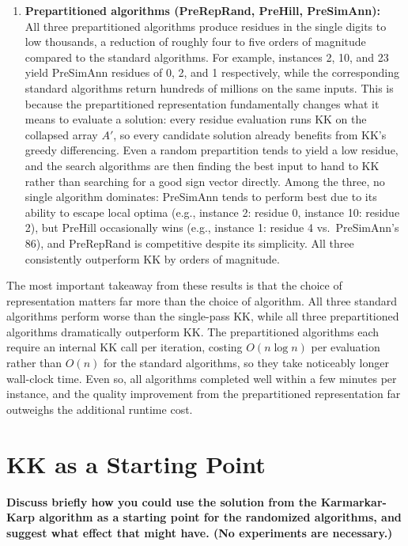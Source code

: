 \documentclass[11pt]{article}
\begin{document}
\begin{enumerate}
    \item \textbf{Prepartitioned algorithms (PreRepRand, PreHill, PreSimAnn):} \\
    All three prepartitioned algorithms produce residues in the single digits to low thousands, a reduction of roughly four to five orders of magnitude compared to the standard algorithms. For example, instances 2, 10, and 23 yield PreSimAnn residues of 0, 2, and 1 respectively, while the corresponding standard algorithms return hundreds of millions on the same inputs. This is because the prepartitioned representation fundamentally changes what it means to evaluate a solution: every residue evaluation runs KK on the collapsed array $A'$, so every candidate solution already benefits from KK's greedy differencing. Even a random prepartition tends to yield a low residue, and the search algorithms are then finding the best input to hand to KK rather than searching for a good sign vector directly. Among the three, no single algorithm dominates: PreSimAnn tends to perform best due to its ability to escape local optima (e.g., instance 2: residue 0, instance 10: residue 2), but PreHill occasionally wins (e.g., instance 1: residue 4 vs.\ PreSimAnn's 86), and PreRepRand is competitive despite its simplicity. All three consistently outperform KK by orders of magnitude.
\end{enumerate}

The most important takeaway from these results is that the choice of representation matters far more than the choice of algorithm. All three standard algorithms perform worse than the single-pass KK, while all three prepartitioned algorithms dramatically outperform KK. The prepartitioned algorithms each require an internal KK call per iteration, costing $O(n \log n)$ per evaluation rather than $O(n)$ for the standard algorithms, so they take noticeably longer wall-clock time. Even so, all algorithms completed well within a few minutes per instance, and the quality improvement from the prepartitioned representation far outweighs the additional runtime cost.

\smallskip

\section{KK as a Starting Point}
{\bf Discuss briefly how you could use the solution from the
Karmarkar-Karp algorithm as a starting point for the randomized
algorithms, and suggest what effect that might have. 
(No experiments are necessary.)}
\end{document}
